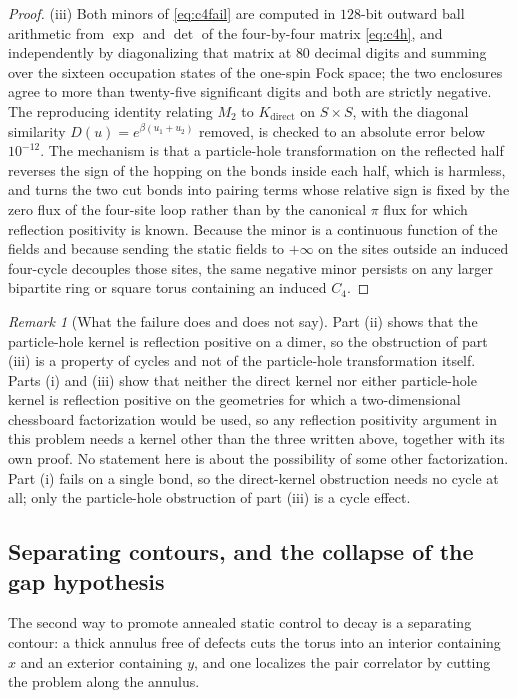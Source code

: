 \documentclass[11pt]{article}
\theoremstyle{definition}
\theoremstyle{remark}
\newtheorem{remark}[theorem]{Remark}
\begin{document}
\begin{proof}
(iii) Both minors of \eqref{eq:c4fail} are computed in $128$-bit outward ball
arithmetic from $\exp$ and $\det$ of the four-by-four matrix \eqref{eq:c4h}, and
independently by diagonalizing that matrix at $80$ decimal digits and summing over the
sixteen occupation states of the one-spin Fock space; the two enclosures agree to more
than twenty-five significant digits and both are strictly negative. The reproducing
identity relating $M_2$ to $K_{\mathrm{direct}}$ on $S\times S$, with the diagonal
similarity $D(u)=e^{\beta(u_1+u_2)}$ removed, is checked to an absolute error below
$10^{-12}$. The mechanism is that a
particle-hole transformation on the reflected half reverses the sign of the hopping on
the bonds inside each half, which is harmless, and turns the two cut bonds into pairing
terms whose relative sign is fixed by the zero flux of the four-site loop rather than
by the canonical $\pi$ flux for which reflection positivity is known. Because the
minor is a continuous function of the fields and because sending the static fields to
$+\infty$ on the sites outside an induced four-cycle decouples those sites, the same
negative minor persists on any larger bipartite ring or square torus containing an
induced $C_4$.
\end{proof}

\begin{remark}[What the failure does and does not say]
\label{rem:rpscope}
Part (ii) shows that the particle-hole kernel is reflection positive on a dimer, so
the obstruction of part (iii) is a property of cycles and not of the particle-hole
transformation itself. Parts (i) and (iii) show that neither the direct kernel nor
either particle-hole kernel is reflection positive on the geometries for which a
two-dimensional chessboard factorization would be used, so any reflection positivity
argument in this problem needs a kernel other than the three written above, together
with its own proof. No statement here is about the possibility of some other
factorization. Part (i) fails on a single bond, so the direct-kernel obstruction needs
no cycle at all; only the particle-hole obstruction of part (iii) is a cycle effect.
\end{remark}

\subsection{Separating contours, and the collapse of the gap hypothesis}

The second way to promote annealed static control to decay is a separating contour: a
thick annulus free of defects cuts the torus into an interior containing $x$ and an
exterior containing $y$, and one localizes the pair correlator by cutting the problem
along the annulus.
\end{document}
